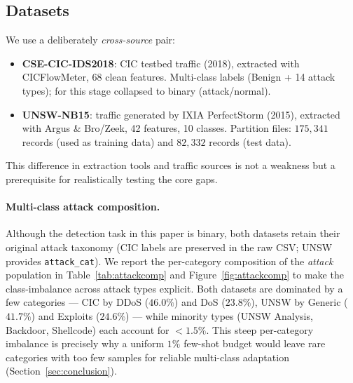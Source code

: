 \documentclass[preprint,12pt,authoryear]{elsarticle}
\begin{document}
\subsection{Datasets}
We use a deliberately \emph{cross-source} pair:
\begin{itemize}
  \item \textbf{CSE-CIC-IDS2018}: CIC testbed traffic (2018), extracted with
  CICFlowMeter, 68 clean features. Multi-class labels (Benign + 14 attack types);
  for this stage collapsed to binary (attack/normal).
  \item \textbf{UNSW-NB15}: traffic generated by IXIA PerfectStorm (2015),
  extracted with Argus \& Bro/Zeek, 42 features, 10 classes. Partition files:
  $175{,}341$ records (used as training data) and $82{,}332$ records (test data).
\end{itemize}
This difference in extraction tools and traffic sources is not a weakness but a
prerequisite for realistically testing the core gaps.

\paragraph{Multi-class attack composition.} Although the detection task in this
paper is binary, both datasets retain their original attack taxonomy (CIC labels
are preserved in the raw CSV; UNSW provides \texttt{attack\_cat}). We report the
per-category composition of the \emph{attack} population in
Table~\ref{tab:attackcomp} and Figure~\ref{fig:attackcomp} to make the
class-imbalance across attack types explicit. Both datasets are dominated by a few
categories --- CIC by DDoS ($46.0\%$) and DoS ($23.8\%$), UNSW by Generic
($41.7\%$) and Exploits ($24.6\%$) --- while minority types (UNSW Analysis,
Backdoor, Shellcode) each account for $<1.5\%$. This steep per-category imbalance
is precisely why a uniform $1\%$ few-shot budget would leave rare categories with
too few samples for reliable multi-class adaptation (Section~\ref{sec:conclusion}).
\end{document}
